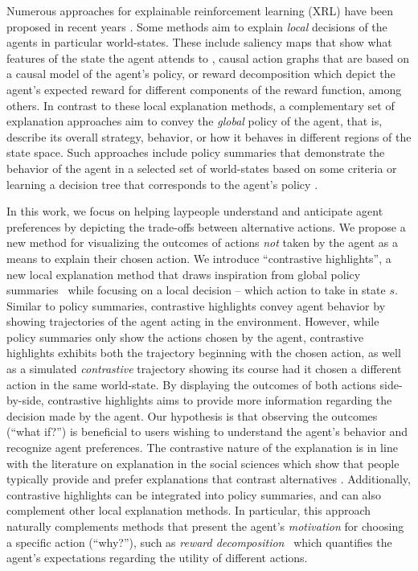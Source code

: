 \documentclass{ecai}
\begin{document}
Numerous approaches for explainable reinforcement learning (XRL) have been proposed in recent years \cite{milani2022survey}. Some methods aim to explain \emph{local} decisions of the agents in particular world-states. These include saliency maps that show what features of the state the agent attends to \cite{greydanus2017visualizing}, causal action graphs \cite{madumal2020explainable} that are based on a causal model of the agent's policy, or reward decomposition \cite{juozapaitis2019explainable} which depict the agent's expected reward for different components of the reward function, among others. In contrast to these local explanation methods, a complementary set of explanation approaches aim to convey the \emph{global} policy of the agent, that is, describe its overall strategy, behavior, or how it behaves in different regions of the state space. Such approaches include policy summaries \cite{amir2019summarizing} that demonstrate the behavior of the agent in a selected set of world-states based on some criteria or learning a decision tree that corresponds to the agent's policy \cite{liu2018toward}. 


In this work, we focus on helping laypeople understand and anticipate agent preferences by depicting the trade-offs between alternative actions. We propose a new method for visualizing the outcomes of actions \textit{not} taken by the agent as a means to explain their chosen action. We introduce ``contrastive highlights'', a new local explanation method that draws inspiration from global policy summaries~\cite{amir2019summarizing} while focusing on a local decision -- which action to take in state $s$. Similar to policy summaries, contrastive highlights convey agent behavior by showing trajectories of the agent acting in the environment. However, while policy summaries only show the actions chosen by the agent, contrastive highlights exhibits both the trajectory beginning with the chosen action, as well as a simulated \emph{contrastive} trajectory showing its course had it chosen a different action in the same world-state. By displaying the outcomes of both actions side-by-side, contrastive highlights aims to provide more information regarding the decision made by the agent. Our hypothesis is that observing the outcomes (“what if?”) is beneficial to users wishing to understand the agent’s behavior and recognize agent preferences. The contrastive nature of the explanation is in line with the literature on explanation in the social sciences which show that people typically provide and prefer explanations that contrast alternatives \cite{miller2019explanation}. Additionally, contrastive highlights can be integrated into policy summaries, and can also complement other local explanation methods. In particular, this approach naturally complements methods that present the agent’s \textit{motivation} for choosing a specific action (“why?”), such as \textit{reward decomposition}~\cite{juozapaitis2019explainable} which quantifies the agent's expectations regarding the utility of different actions. 
\end{document}
